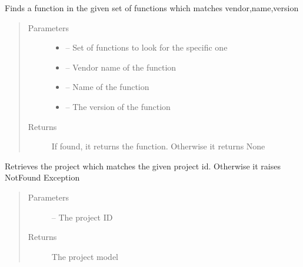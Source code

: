 \documentclass[letterpaper,10pt,english]{sphinxmanual}
\begin{document}
\begin{fulllineitems}
\label{_source/son_editor.impl:son_editor.impl.nsfslookupimpl.get_function}
Finds a function in the given set of functions which matches vendor,name,version
\begin{quote}\begin{description}
\item[{Parameters}] \leavevmode\begin{itemize}
\item {} 
 -- Set of functions to look for the specific one

\item {} 
 -- Vendor name of the function

\item {} 
 -- Name of the function

\item {} 
 -- The version of the function

\end{itemize}

\item[{Returns}] \leavevmode
If found, it returns the function. Otherwise it returns None

\end{description}\end{quote}

\end{fulllineitems}


\begin{fulllineitems}
\label{_source/son_editor.impl:son_editor.impl.nsfslookupimpl.get_project}
Retrieves the project which matches the given project id. Otherwise it raises NotFound Exception
\begin{quote}\begin{description}
\item[{Parameters}] \leavevmode
{} -- The project ID

\item[{Returns}] \leavevmode
The project model

\end{description}\end{quote}

\end{fulllineitems}
\end{document}
